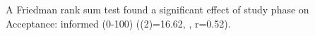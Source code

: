 A Friedman rank sum test found a significant effect of study phase on Acceptance: informed (0-100) (\chisq(2)=16.62, , r=0.52). 
